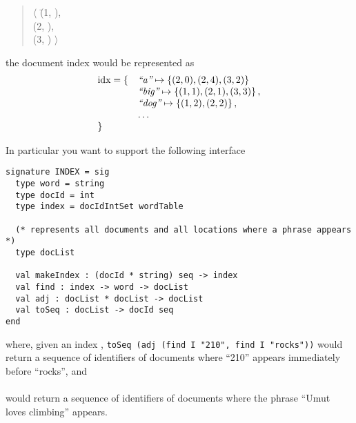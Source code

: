 \begin{quote}
\begin{tabbing}
 $\langle$
  \=(1, ), \\
  \>(2, ),\\
  \>(3, ) $\rangle$
\end{tabbing}
\end{quote}

the document index would be represented as
\[
\begin{array}{ll}
\text{idx} = \{ & \mbox{\rm\em ``a''} \mapsto \left\{ (2,0),(2,4),(3,2) \right\}
\\
                &  \mbox{\rm\em ``big''} \mapsto \left\{ (1,1),(2,1),(3,3) \right\},
\\
                & \mbox{\rm\em ``dog''} \mapsto \left\{ (1,2),(2,2) \right\},
\\
                & \ldots
\\
             \} &
\end{array}
\]

In particular you want to support the following interface
\begin{lstlisting}[numbers=none]
signature INDEX = sig
  type word = string
  type docId = int
  type index = docIdIntSet wordTable
  
  (* represents all documents and all locations where a phrase appears *)
  type docList

  val makeIndex : (docId * string) seq -> index    
  val find : index -> word -> docList
  val adj : docList * docList -> docList
  val toSeq : docList -> docId seq 
end
\end{lstlisting}
%
where, given an index ,
\texttt{toSeq (adj (find I "210", find I "rocks"))} would return a sequence of
identifiers of documents
where ``210'' appears immediately before ``rocks'', and 
\\
\\
would return a sequence of identifiers of documents
where the phrase ``Umut loves climbing'' appears.


